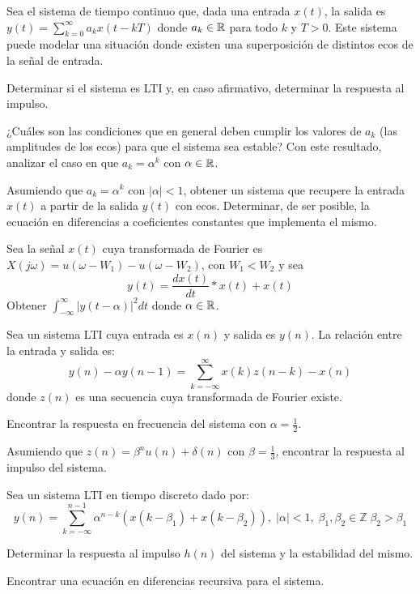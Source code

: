 \begin{ejercicio}
    Sea el sistema de tiempo continuo que, dada una entrada $x(t)$, la salida es $y(t) = \sum_{k=0}^{\infty} a_k x(t-kT)$ donde $a_k \in \mathbb{R}$ para todo $k$ y $T>0$. Este sistema puede modelar una situación donde existen una superposición de distintos ecos de la señal de entrada.

    \inciso Determinar si el sistema es LTI y, en caso afirmativo, determinar la respuesta al impulso.

    \inciso ¿Cuáles son las condiciones que en general deben cumplir los valores de $a_k$ (las amplitudes de
    los ecos) para que el sistema sea estable? Con este resultado, analizar el caso en que $a_k = \alpha^k$ con $\alpha \in \mathbb{R}$.

    \inciso Asumiendo que $a_k = \alpha^k$ con $|\alpha| < 1$, obtener un sistema que recupere la entrada $x(t)$ a partir de la salida $y(t)$ con ecos. Determinar, de ser posible, la ecuación en diferencias a coeficientes constantes que implementa el mismo. 
\end{ejercicio}

\begin{ejercicio}
    Sea la señal $x(t)$ cuya transformada de Fourier es $X(j\omega) = u(\omega - W_1) - u(\omega - W_2)$, con $W_1 < W_2$ y sea 
    \begin{equation*}
        y(t) = \frac{dx(t)}{dt} * x(t) + x(t)
    \end{equation*}
    Obtener $\int_{-\infty}^{\infty} |y(t-\alpha)|^2 dt$ donde $\alpha \in \mathbb{R}$.
\end{ejercicio}

\begin{ejercicio}
    Sea un sistema LTI cuya entrada es $x(n)$ y salida es $y(n)$. La relación entre la entrada y salida es:
    \begin{equation*}
        y(n) - \alpha y(n-1) = \sum_{k=-\infty}^{\infty} x(k) z(n-k) - x(n)
    \end{equation*}
    donde $z(n)$ es una secuencia cuya transformada de Fourier existe. 

    \inciso Encontrar la respuesta en frecuencia del sistema con $\alpha = \frac{1}{2}$. 

    \inciso Asumiendo que $z(n) = \beta^n u(n) + \delta(n)$ con $\beta = \frac{1}{3}$, encontrar la respuesta al impulso del sistema.
\end{ejercicio}

\begin{ejercicio}
    Sea un sistema LTI en tiempo discreto dado por:
    \begin{equation*}
        y(n) = \sum_{k=-\infty}^{n-1} \alpha^{n-k} \left( x(k - \beta_1) + x(k - \beta_2) \right),\; |\alpha| < 1, \; \beta_1, \beta_2 \in \mathbb{Z}\; \beta_2 > \beta_1
    \end{equation*}

    \inciso Determinar la respuesta al impulso $h(n)$ del sistema y la estabilidad del mismo. 

    \inciso Encontrar una ecuación en diferencias recursiva para el sistema.
\end{ejercicio}

